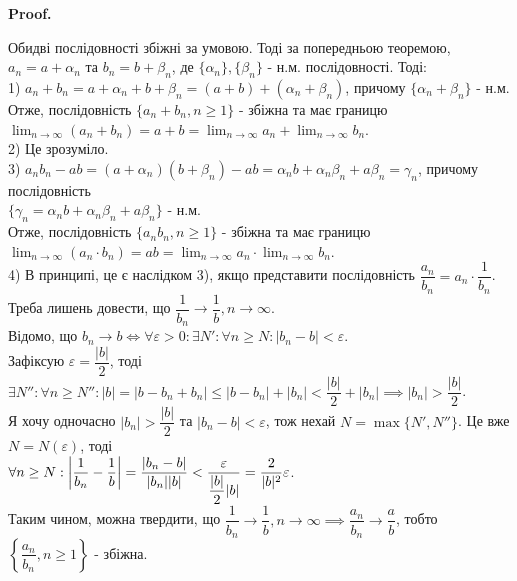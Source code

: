 \documentclass[a4paper, 14pt]{article}
\makeatletter
\def\qed{$\blacksquare$}
\theoremstyle{theoremdd}
\theoremstyle{theoremdd}
\theoremstyle{theoremdd}
\theoremstyle{theoremdd}
\theoremstyle{theoremdd}
\theoremstyle{theoremdd}
\theoremstyle{theoremdd}
\theoremstyle{theoremdd}
\renewenvironment{proof}[1][Proof.\\]{\par
\pushQED{\hfill \qed}%
\normalfont \topsep6\p@\@plus6\p@\relax
\trivlist
\item\relax
{\bfseries
#1\@addpunct{.}}\hspace\labelsep\ignorespaces
}{%
\popQED\endtrivlist\@endpefalse
}
\makeatother
\begin{document}
	\begin{proof}
	Обидві послідовності збіжні за умовою. Тоді за попередньою теоремою, $a_n = a + \alpha_n$ та $b_n=b+\beta_n$, де $\{\alpha_n\}, \{\beta_n\}$ - н.м. послідовності. Тоді:\\
	1) $a_n+b_n=a+\alpha_n+b+\beta_n=(a+b)+(\alpha_n+\beta_n)$, причому $\{\alpha_n + \beta_n\}$ - н.м. \\ Отже, послідовність $\{a_n+b_n, n \geq 1\}$ - збіжна та має границю $\displaystyle \lim_{n \to \infty} (a_n+b_n) = a+b = \lim_{n \to \infty} a_n+\lim_{n \to \infty} b_n$.
	\bigskip \\
	2) Це зрозуміло.
	\bigskip \\
	3) $a_n b_n - ab = (a+\alpha_n)(b+\beta_n) - ab = \alpha_n b + \alpha_n \beta_n + a \beta_n = \gamma_n$, причому послідовність \\ $\{\gamma_n = \alpha_n b + \alpha_n \beta_n + a \beta_n \}$ - н.м. \\
	Отже, послідовність $\{a_n b_n, n \geq 1\}$ - збіжна та має границю $\displaystyle \lim_{n \to \infty} (a_n \cdot b_n) = ab = \lim_{n \to \infty} a_n \cdot \lim_{n \to \infty} b_n$.
	\bigskip \\
	4) В принципі, це є наслідком 3), якщо представити послідовність $\dfrac{a_n}{b_n} = a_n \cdot \dfrac{1}{b_n}$.\\
	Треба лишень довести, що $\dfrac{1}{b_n} \to \dfrac{1}{b}, n \to \infty$.\\
	Відомо, що $b_n \to b \iff \forall \varepsilon > 0: \exists N': \forall n \geq N: |b_n-b| < \varepsilon$.\\
	Зафіксую $\varepsilon = \dfrac{|b|}{2}$, тоді $\exists N'': \forall n \geq N'':  |b| = |b - b_n + b_n| \leq |b - b_n| + |b_n| < \dfrac{|b|}{2} + |b_n| \implies |b_n| > \dfrac{|b|}{2}$.\\
	Я хочу одночасно $|b_n| > \dfrac{|b|}{2}$ та $|b_n - b| < \varepsilon$, тож нехай $N = \max \{N', N'' \}$. Це вже $N = N(\varepsilon)$, тоді\\
	$\forall n \geq N: \abs{\dfrac{1}{b_n} - \dfrac{1}{b}} = \dfrac{|b_n -b|}{|b_n| |b|} < \dfrac{\varepsilon}{ \dfrac{|b|}{2} |b|} = \dfrac{2}{|b|^2} \varepsilon$.\\
	Таким чином, можна твердити, що $\dfrac{1}{b_n} \to \dfrac{1}{b}, n \to \infty \implies \dfrac{a_n}{b_n} \to \dfrac{a}{b}$, тобто $\left\{ \dfrac{a_n}{b_n}, n \geq 1 \right\}$ - збіжна.
	\end{proof}
	
\end{document}
